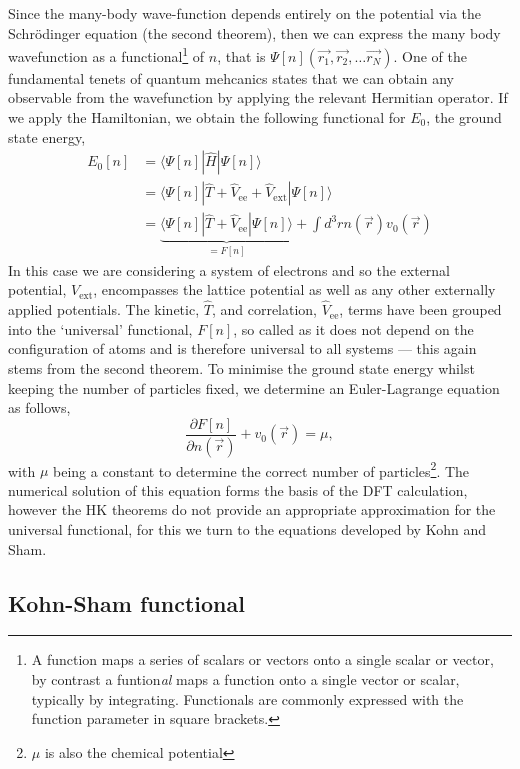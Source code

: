 Since the many-body wave-function depends entirely on the potential via the Schr\"odinger equation (the second theorem), then we can express the many body wavefunction as a functional\footnote{A function maps a series of scalars or vectors onto a single scalar or vector, by contrast a funtion\emph{al} maps a function onto a single vector or scalar, typically by integrating. Functionals are commonly expressed with the function parameter in square brackets.} of $n$, that is $\Psi[n](\vec{r_1}, \vec{r_2}, \ldots \vec{r_N})$. One of the fundamental tenets of quantum mehcanics states that we can obtain any observable from the wavefunction by applying the relevant Hermitian operator. If we apply the Hamiltonian, we obtain the following functional for $E_0$, the ground state energy,
\begin{align}
    E_0[n] &= \langle \Psi[n]|\hat{H}|\Psi[n]\rangle \\
           &= \langle \Psi[n]|\hat{T} + \hat{V}_{\textrm{ee}} + \hat{V}_{\textrm{ext}}|\Psi[n] \rangle \\
           &= \underbrace{\langle \Psi[n]|\hat{T} + \hat{V}_{\textrm{ee}}|\Psi[n]\rangle}_{=F[n]} + \int d^3rn(\vec{r})v_0(\vec{r})
\end{align}
In this case we are considering a system of electrons and so the external potential, $V_{\textrm{ext}}$, encompasses the lattice potential as well as any other externally applied potentials. The kinetic, $\hat{T}$, and correlation, $\hat{V}_{\textrm{ee}}$, terms have been grouped into the `universal' functional, $F[n]$, so called as it does not depend on the configuration of atoms and is therefore universal to all systems --- this again stems from the second theorem. To minimise the ground state energy whilst keeping the number of particles fixed, we determine an Euler-Lagrange equation as follows,
\begin{equation}
\frac{\partial F[n]}{\partial n(\vec{r})} + v_0(\vec{r}) = \mu,
\end{equation}
with $\mu$ being a constant to determine the correct number of particles\footnote{$\mu$ is also the chemical potential}. The numerical solution of this equation forms the basis of the \ac{DFT} calculation, however the \ac{HK} theorems do not provide an appropriate approximation for the universal functional, for this we turn to the equations developed by Kohn and Sham.

\subsection{Kohn-Sham functional}

